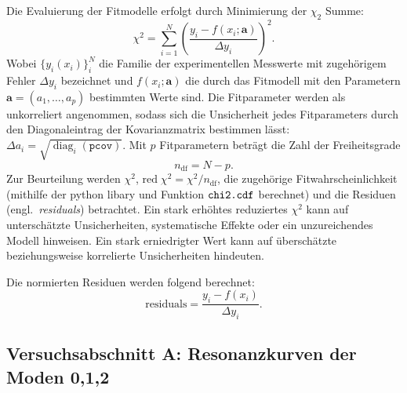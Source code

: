 \documentclass[11pt,a4paper]{article}
\newcommand{\libary}[1]{\textcolor{libarygreen}{\texttt{\detokenize{#1}}}}
\begin{document}
Die Evaluierung der Fitmodelle erfolgt durch Minimierung der \(\chi_2\) Summe:
\begin{equation}
    \chi^2=\sum_{i=1}^{N}\left(\frac{y_i-f(x_i;\boldsymbol{a})}{\Delta y_i}\right)^2.
    \label{eq:chi2}
\end{equation}
Wobei \(\{y_i(x_i)\}_i^N\) die Familie der experimentellen Messwerte mit zugehörigem Fehler \(\Delta y_i\) bezeichnet und \(f(x_i;\boldsymbol{a})\) die durch das Fitmodell mit den Parametern \(\boldsymbol{a}=(a_1,\dots,a_p)\) bestimmten Werte sind. Die Fitparameter werden als unkorreliert angenommen, sodass sich die Unsicherheit jedes Fitparameters durch den Diagonaleintrag der Kovarianzmatrix bestimmen lässt: \(\Delta a_i=\sqrt{\operatorname{diag}_i(\texttt{pcov})}\). Mit $p$ Fitparametern beträgt die Zahl der Freiheitsgrade
\begin{equation}
    n_{\mathrm{df}}=N-p.
\end{equation}
Zur Beurteilung werden $\chi^2$, $\mathrm{red}\;\chi^2= \chi^2/n_{\mathrm{df}}$, die zugehörige Fitwahrscheinlichkeit (mithilfe der python libary \libary{scipy.stats.chi2} und Funktion $\verb|chi2.cdf|$ berechnet)\autocite[128]{Skript_2.1} und die Residuen (engl.\ \emph{residuals}) betrachtet. Ein stark erhöhtes reduziertes $\chi^2$ kann auf unterschätzte Unsicherheiten, systematische Effekte oder ein unzureichendes Modell hinweisen. Ein stark erniedrigter Wert kann auf überschätzte beziehungsweise korrelierte Unsicherheiten hindeuten.

Die normierten Residuen werden folgend berechnet:
\begin{equation}
    \mathrm{residuals}=\frac{y_i-f(x_i)}{\Delta y_i}.
    \label{eq:residuen}
\end{equation}


\subsection{Versuchsabschnitt A: Resonanzkurven der Moden 0,1,2}
\end{document}
